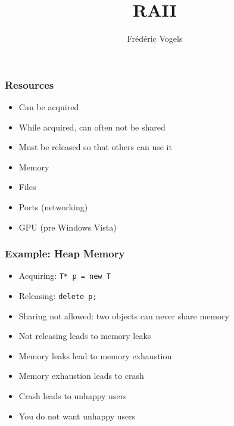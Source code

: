 \usepackage{ucll-code}

\usetikzlibrary{shadows,shapes.multipart}

\title{RAII}
\author{Fr\'ed\'eric Vogels}




\begin{frame}
  \titlepage
\end{frame}

\begin{frame}
  \frametitle{Resources}
  \begin{itemize}
    \item Can be acquired
    \item While acquired, can often not be shared
    \item Must be released so that others can use it
  \end{itemize}
  \vskip5mm
  \begin{itemize}
    \item Memory
    \item Files
    \item Ports (networking)
    \item GPU (pre Windows Vista)
  \end{itemize}
\end{frame}

\begin{frame}
  \frametitle{Example: Heap Memory}
  \begin{itemize}
    \item Acquiring: {\tt T* p = new T}
    \item Releasing: {\tt delete p;}
    \item Sharing not allowed: two objects can never share memory
    \item Not releasing leads to memory leaks 
    \item Memory leaks lead to memory exhaustion
    \item Memory exhaustion leads to crash
    \item Crash leads to unhappy users
    \item You do not want unhappy users
  \end{itemize}
\end{frame}

